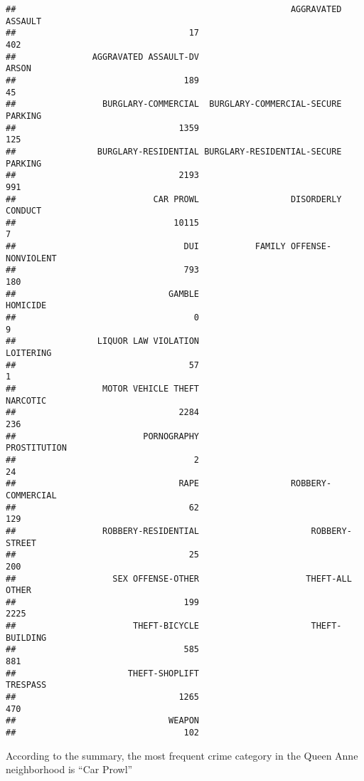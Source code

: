 \documentclass[]{article}
\begin{document}
\begin{verbatim}
##                                                      AGGRAVATED ASSAULT 
##                                  17                                 402 
##               AGGRAVATED ASSAULT-DV                               ARSON 
##                                 189                                  45 
##                 BURGLARY-COMMERCIAL  BURGLARY-COMMERCIAL-SECURE PARKING 
##                                1359                                 125 
##                BURGLARY-RESIDENTIAL BURGLARY-RESIDENTIAL-SECURE PARKING 
##                                2193                                 991 
##                           CAR PROWL                  DISORDERLY CONDUCT 
##                               10115                                   7 
##                                 DUI           FAMILY OFFENSE-NONVIOLENT 
##                                 793                                 180 
##                              GAMBLE                            HOMICIDE 
##                                   0                                   9 
##                LIQUOR LAW VIOLATION                           LOITERING 
##                                  57                                   1 
##                 MOTOR VEHICLE THEFT                            NARCOTIC 
##                                2284                                 236 
##                         PORNOGRAPHY                        PROSTITUTION 
##                                   2                                  24 
##                                RAPE                  ROBBERY-COMMERCIAL 
##                                  62                                 129 
##                 ROBBERY-RESIDENTIAL                      ROBBERY-STREET 
##                                  25                                 200 
##                   SEX OFFENSE-OTHER                     THEFT-ALL OTHER 
##                                 199                                2225 
##                       THEFT-BICYCLE                      THEFT-BUILDING 
##                                 585                                 881 
##                      THEFT-SHOPLIFT                            TRESPASS 
##                                1265                                 470 
##                              WEAPON 
##                                 102
\end{verbatim}

According to the summary, the most frequent crime category in the Queen
Anne neighborhood is ``Car Prowl''
\end{document}
